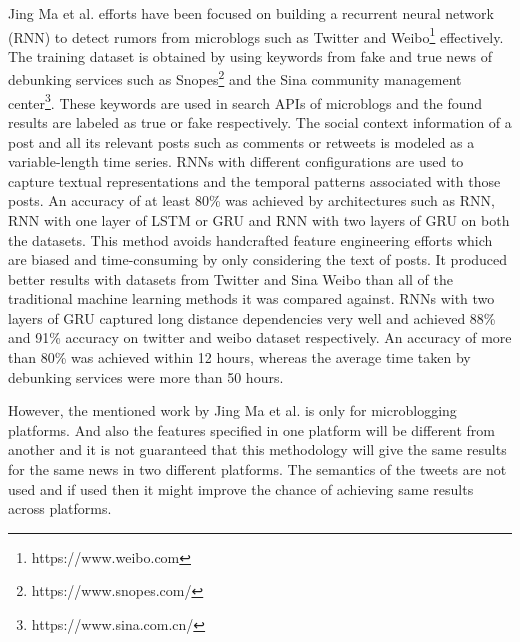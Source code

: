 \documentclass[a4paper, 11pt]{article}
\begin{document}
Jing Ma et al.\cite{Ma} efforts have been focused on building a recurrent neural network (RNN) to detect rumors from microblogs such as Twitter and Weibo\footnote{https://www.weibo.com} effectively. The training dataset is obtained by using keywords from fake and true news of debunking services such as Snopes\footnote{https://www.snopes.com/} and the Sina community management center\footnote{https://www.sina.com.cn/}. These keywords are used in search APIs of microblogs and the found results are labeled as true or fake respectively. The social context information of a post and all its relevant posts such as comments or retweets is modeled as a variable-length time series. RNNs with different configurations are used to capture textual representations and the temporal patterns associated with those posts. An accuracy of at least 80\% was achieved by architectures such as RNN, RNN with one layer of LSTM or GRU and RNN with two layers of GRU on both the datasets. This method avoids handcrafted feature engineering efforts which are biased and time-consuming by only considering the text of posts. It produced better results with datasets from Twitter and Sina Weibo than all of the traditional machine learning methods it was compared against. RNNs with two layers of GRU captured long distance dependencies very well and achieved 88\% and 91\% accuracy on twitter and weibo dataset respectively. An accuracy of more than 80\% was achieved within 12 hours, whereas the average time taken by debunking services were more than 50 hours.

However, the mentioned work by Jing Ma et al. is only for microblogging platforms. And also the features specified in one platform will be different from another and it is not guaranteed that this methodology will give the same results for the same news in two different platforms. The semantics of the tweets are not used and if used then it might improve the chance of achieving same results across platforms.
\end{document}
